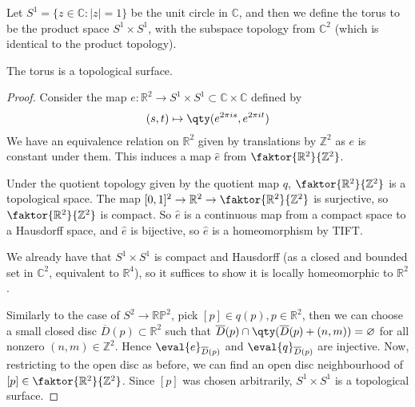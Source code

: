 \begin{example}
	Let $S^1 = \{z \in \mathbb{C} : |z| = 1\}$ be the unit circle in $\mathbb C$, and then we define the torus to be the product space $S^1 \times S^1$, with the subspace topology from $\mathbb C^2$ (which is identical to the product topology).
	\begin{lemma}
		The torus is a topological surface.
	\end{lemma}
	\begin{proof}
		Consider the map $e : \mathbb R^2 \to S^1 \times S^1 \subset \mathbb{C} \times \mathbb{C}$ defined by
		\begin{align*}
			(s,t) \mapsto \qty(e^{2\pi i s}, e^{2 \pi i t})
		\end{align*}
		We have an equivalence relation on $\mathbb{R}^2$ given by translations by $\mathbb{Z}^2$ as $e$ is constant under them.
		This induces a map $\hat e$ from $\faktor{\mathbb R^2}{\mathbb Z^2}$.

		\begin{center}
			\ifdefined\hideproofs
			\else
			\fi
		\end{center}

		Under the quotient topology given by the quotient map $q$, $\faktor{\mathbb R^2}{\mathbb Z^2}$ is a topological space.
		The map $[0,1]^2 \to \mathbb R^2 \to \faktor{\mathbb R^2}{\mathbb Z^2}$ is surjective, so $\faktor{\mathbb R^2}{\mathbb Z^2}$ is compact.
		So $\hat e$ is a continuous map from a compact space to a Hausdorff space, and $\hat e$ is bijective, so $\hat e$ is a homeomorphism by TIFT.

		We already have that $S^1 \times S^1$ is compact and Hausdorff (as a closed and bounded set in $\mathbb C^2$, equivalent to $\mathbb{R}^4$), so it suffices to show it is locally homeomorphic to $\mathbb R^2$.

		Similarly to the case of $S^2 \to \mathbb{R} \mathbb{P}^2$, pick $[p] \in q(p), p \in \mathbb{R}^2$, then we can choose a small closed disc $\overline D(p) \subset \mathbb{R}^2$ such that $\overline D(p) \cap \qty(\overline D(p) + (n,m)) = \varnothing$ for all nonzero $(n,m) \in \mathbb Z^2$.
		Hence $\eval{e}_{\overline D(p)}$ and $\eval{q}_{\overline D(p)}$ are injective.
		Now, restricting to the open disc as before, we can find an open disc neighbourhood of $[p] \in \faktor{\mathbb R^2}{\mathbb Z^2}$.
		Since $[p]$ was chosen arbitrarily, $S^1 \times S^1$ is a topological surface.
	\end{proof}


\end{example}
